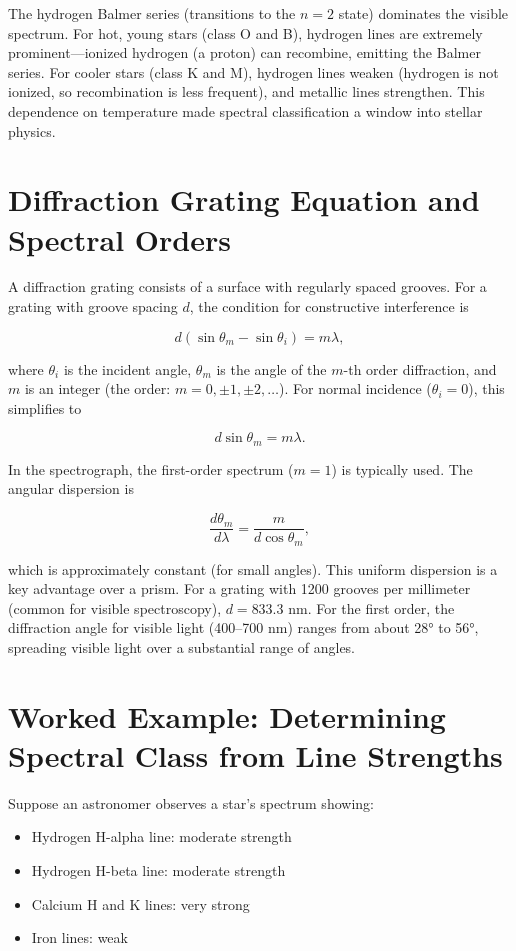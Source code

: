 The hydrogen Balmer series (transitions to the $n=2$ state) dominates the visible spectrum. For hot, young stars (class O and B), hydrogen lines are extremely prominent—ionized hydrogen (a proton) can recombine, emitting the Balmer series. For cooler stars (class K and M), hydrogen lines weaken (hydrogen is not ionized, so recombination is less frequent), and metallic lines strengthen. This dependence on temperature made spectral classification a window into stellar physics.

\section{Diffraction Grating Equation and Spectral Orders}

A diffraction grating consists of a surface with regularly spaced grooves. For a grating with groove spacing $d$, the condition for constructive interference is

\[
  d(\sin \theta_m - \sin \theta_i) = m\lambda,
\]

where $\theta_i$ is the incident angle, $\theta_m$ is the angle of the $m$-th order diffraction, and $m$ is an integer (the order: $m = 0, \pm 1, \pm 2, \ldots$). For normal incidence ($\theta_i = 0$), this simplifies to

\[
  d \sin \theta_m = m\lambda.
\]

In the spectrograph, the first-order spectrum ($m=1$) is typically used. The angular dispersion is

\[
  \frac{d\theta_m}{d\lambda} = \frac{m}{d \cos \theta_m},
\]

which is approximately constant (for small angles). This uniform dispersion is a key advantage over a prism. For a grating with 1200 grooves per millimeter (common for visible spectroscopy), $d = 833.3$ nm. For the first order, the diffraction angle for visible light (400--700 nm) ranges from about 28° to 56°, spreading visible light over a substantial range of angles.

\section{Worked Example: Determining Spectral Class from Line Strengths}

Suppose an astronomer observes a star's spectrum showing:
\begin{itemize}
\item Hydrogen H-alpha line: moderate strength
\item Hydrogen H-beta line: moderate strength
\item Calcium H and K lines: very strong
\item Iron lines: weak
\end{itemize}

